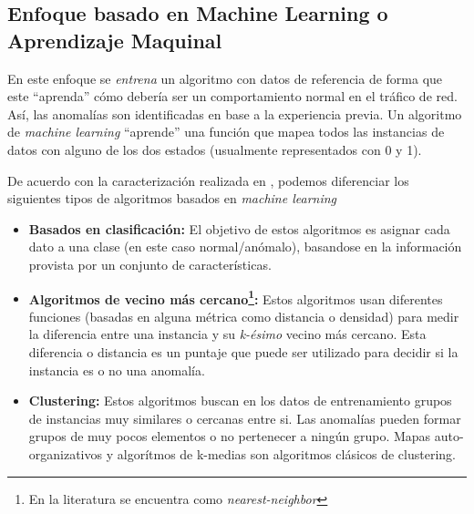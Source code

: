 \documentclass[a4paper,10pt, oneside]{article}
\begin{document}
\subsection{Enfoque basado en Machine Learning o Aprendizaje Maquinal}
En este enfoque se \textit{entrena} un algoritmo con datos de referencia de forma que este ``aprenda'' cómo debería ser un comportamiento normal en el tráfico de red. Así, las anomalías son identificadas en base a la experiencia previa. Un algoritmo de \textit{machine learning} ``aprende'' una función que mapea todos las instancias de datos con alguno de los dos estados (usualmente representados con 0 y 1). \par

De acuerdo con la caracterización realizada en \cite{Chandola:2009:ADS:1541880.1541882}, podemos diferenciar los siguientes tipos de algoritmos basados en \textit{machine learning}
\begin{itemize}
	\item \textbf{Basados en clasificación:} El objetivo de estos algoritmos es asignar cada dato a una clase (en este caso normal/anómalo), basandose en la información provista por un conjunto de características.
	\item \textbf{Algoritmos de vecino más cercano\footnote{En la literatura se encuentra como \textit{nearest-neighbor}}:} Estos algoritmos usan diferentes funciones (basadas en alguna métrica como distancia o densidad) para medir la diferencia entre una instancia y su \textit{k-ésimo} vecino más cercano\cite{Chandola:2009:ADS:1541880.1541882}. Esta diferencia o distancia es un puntaje que puede ser utilizado para decidir si la instancia es o no una anomalía.
	\item \textbf{Clustering:} Estos algoritmos buscan en los datos de entrenamiento grupos de instancias muy similares o cercanas entre si. Las anomalías pueden formar grupos de muy pocos elementos o no pertenecer a ningún grupo. Mapas auto-organizativos\cite{Kohonen:1997:SM:261082} y algorítmos de k-medias\cite{Hartigan/Wong:79} son algoritmos clásicos de clustering.
\end{itemize}
\end{document}
